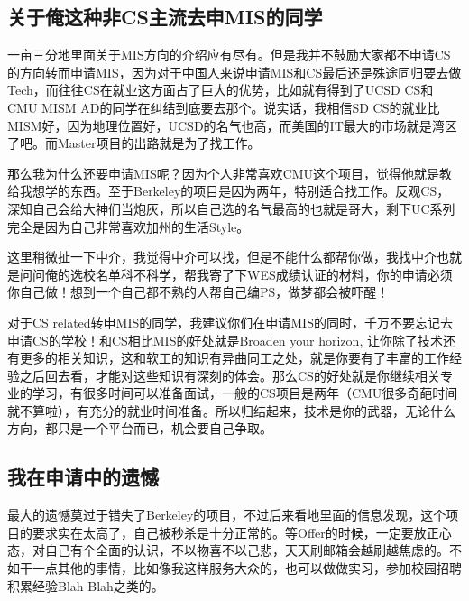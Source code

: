 \subsection{关于俺这种非CS主流去申MIS的同学}
一亩三分地里面关于MIS方向的介绍应有尽有。但是我并不鼓励大家都不申请CS的方向转而申请MIS，因为对于中国人来说申请MIS和CS最后还是殊途同归要去做Tech，而往往CS在就业这方面占了巨大的优势，比如就有得到了UCSD CS和CMU MISM AD的同学在纠结到底要去那个。说实话，我相信SD CS的就业比MISM好，因为地理位置好，UCSD的名气也高，而美国的IT最大的市场就是湾区了吧。而Master项目的出路就是为了找工作。\par
那么我为什么还要申请MIS呢？因为个人非常喜欢CMU这个项目，觉得他就是教给我想学的东西。至于Berkeley的项目是因为两年，特别适合找工作。反观CS，深知自己会给大神们当炮灰，所以自己选的名气最高的也就是哥大，剩下UC系列完全是因为自己非常喜欢加州的生活Style。\par
这里稍微扯一下中介，我觉得中介可以找，但是不能什么都帮你做，我找中介也就是问问俺的选校名单科不科学，帮我寄了下WES成绩认证的材料，你的申请必须你自己做！想到一个自己都不熟的人帮自己编PS，做梦都会被吓醒！\par
 对于CS related转申MIS的同学，我建议你们在申请MIS的同时，千万不要忘记去申请CS的学校！和CS相比MIS的好处就是Broaden your horizon, 让你除了技术还有更多的相关知识，这和软工的知识有异曲同工之处，就是你要有了丰富的工作经验之后回去看，才能对这些知识有深刻的体会。那么CS的好处就是你继续相关专业的学习，有很多时间可以准备面试，一般的CS项目是两年（CMU很多奇葩时间就不算啦），有充分的就业时间准备。所以归结起来，技术是你的武器，无论什么方向，都只是一个平台而已，机会要自己争取。
\subsection{我在申请中的遗憾}
最大的遗憾莫过于错失了Berkeley的项目，不过后来看地里面的信息发现，这个项目的要求实在太高了，自己被秒杀是十分正常的。等Offer的时候，一定要放正心态，对自己有个全面的认识，不以物喜不以己悲，天天刷邮箱会越刷越焦虑的。不如干一点其他的事情，比如像我这样服务大众的，也可以做做实习，参加校园招聘积累经验Blah Blah之类的。\par

